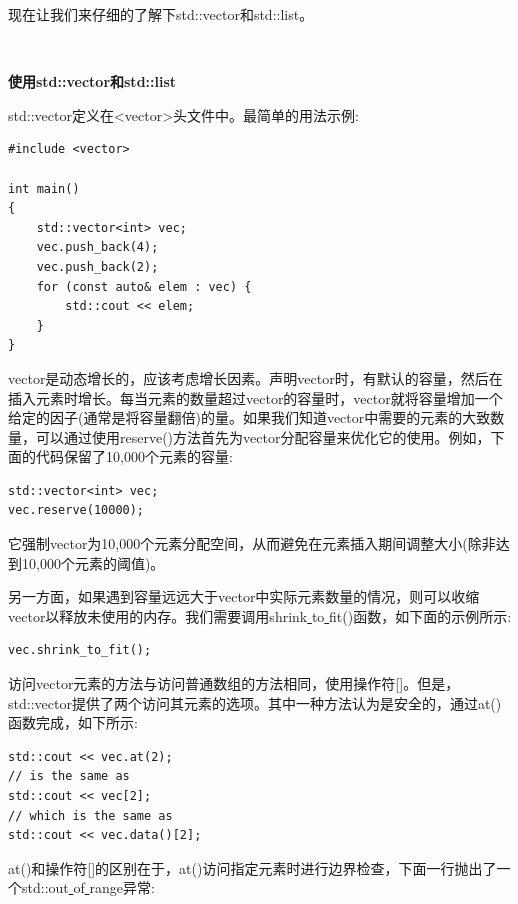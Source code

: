 现在让我们来仔细的了解下std::vector和std::list。  \par

\noindent\textbf{}\ \par
\textbf{使用std::vector和std::list} \ \par
std::vector定义在<vector>头文件中。最简单的用法示例: \par

\begin{lstlisting}[caption={}]
#include <vector>

int main()
{
	std::vector<int> vec;
	vec.push_back(4);
	vec.push_back(2);
	for (const auto& elem : vec) {
		std::cout << elem;
	}
}
\end{lstlisting}

vector是动态增长的，应该考虑增长因素。声明vector时，有默认的容量，然后在插入元素时增长。每当元素的数量超过vector的容量时，vector就将容量增加一个给定的因子(通常是将容量翻倍)的量。如果我们知道vector中需要的元素的大致数量，可以通过使用reserve()方法首先为vector分配容量来优化它的使用。例如，下面的代码保留了10,000个元素的容量: \par

\begin{lstlisting}[caption={}]
std::vector<int> vec;
vec.reserve(10000);
\end{lstlisting}

它强制vector为10,000个元素分配空间，从而避免在元素插入期间调整大小(除非达到10,000个元素的阈值)。 \par
另一方面，如果遇到容量远远大于vector中实际元素数量的情况，则可以收缩vector以释放未使用的内存。我们需要调用shrink\underline{ }to\underline{ }fit()函数，如下面的示例所示: \par

\begin{lstlisting}[caption={}]
vec.shrink_to_fit();
\end{lstlisting}

访问vector元素的方法与访问普通数组的方法相同，使用操作符[]。但是，std::vector提供了两个访问其元素的选项。其中一种方法认为是安全的，通过at()函数完成，如下所示: \par

\begin{lstlisting}[caption={}]
std::cout << vec.at(2);
// is the same as
std::cout << vec[2];
// which is the same as
std::cout << vec.data()[2];
\end{lstlisting}

at()和操作符[]的区别在于，at()访问指定元素时进行边界检查，下面一行抛出了一个std::out\underline{ }of\underline{ }range异常: \par

